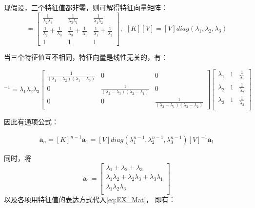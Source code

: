 \documentclass[UTF8,zihao=5]{ctexart}
\newcommand{\bm}[1]{{\mathbf{#1}}}
\begin{document}
现假设，三个特征值都非零，则可解得特征向量矩阵：
\begin{equation}
    [V]=\begin{bmatrix}
        \frac{1}{\lambda_2\lambda_3}            &
        \frac{1}{\lambda_3\lambda_1}            &
        \frac{1}{\lambda_1\lambda_2}                    \\
        \frac{1}{\lambda_2}+\frac{1}{\lambda_3} &
        \frac{1}{\lambda_3}+\frac{1}{\lambda_1} &
        \frac{1}{\lambda_1}+\frac{1}{\lambda_2}         \\
        1                                       & 1 & 1
    \end{bmatrix},\ \ [K][V]=[V]diag(\lambda_1,\lambda_2,\lambda_3)
\end{equation}

当三个特征值互不相同，特征向量是线性无关的，有：

\begin{equation}
    [V]^{-1}=\lambda_1\lambda_2\lambda_3
    \begin{bmatrix}
        \frac{1}{(\lambda_1-\lambda_2)(\lambda_1-\lambda_3)}
          & 0 & 0 \\
        0 &
        \frac{1}{(\lambda_2-\lambda_3)(\lambda_2-\lambda_1)}
          & 0     \\
        0 & 0 &
        \frac{1}{(\lambda_3-\lambda_1)(\lambda_3-\lambda_2)}
    \end{bmatrix}\begin{bmatrix}
        \lambda_1 & 1 & \frac{1}{\lambda_1} \\
        \lambda_2 & 1 & \frac{1}{\lambda_2} \\
        \lambda_3 & 1 & \frac{1}{\lambda_3} \\
    \end{bmatrix}
\end{equation}

因此有通项公式：

\begin{equation}
    \begin{aligned}
        \bm{a}_n=[K]^{n-1}\bm{a}_1
        =[V]diag(\lambda_1^{n-1},\lambda_2^{n-1},\lambda_3^{n-1})[V]^{-1}\bm{a}_1
    \end{aligned}
    \label{eq:EX_Mat}
\end{equation}

同时，将
$$
    \bm{a}_1=\begin{bmatrix}
        \lambda_1+\lambda_2+\lambda_3                            \\
        \lambda_1\lambda_2+\lambda_2\lambda_3+\lambda_3\lambda_1 \\
        \lambda_1\lambda_2\lambda_3                              \\
    \end{bmatrix}
$$
以及各项用特征值的表达方式代入\eqref{eq:EX_Mat}，
即有：
\end{document}
